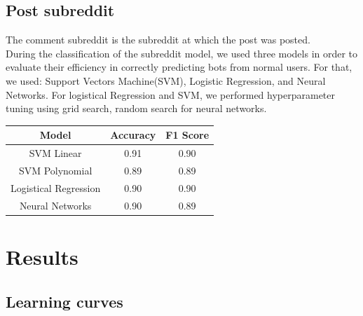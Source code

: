 \documentclass{article}
\begin{document}
    \subsection{Post subreddit}  
    
        The comment subreddit is the subreddit at which the post was posted. \\
    During the classification of  the subreddit model, we used three models in order to evaluate their efficiency in correctly predicting bots from normal users. For that, we used: Support Vectors Machine(SVM), Logistic Regression, and Neural Networks.
For logistical Regression and SVM, we performed hyperparameter tuning using grid search, random search for neural networks.

        \begin{center}
    \begin{tabular}{|c || c| c|} 
     \hline
     Model & Accuracy  & F1 Score  \\ [0.5ex] 
     \hline\hline
     SVM Linear & 0.91  & 0.90 \\ 
     \hline
     SVM Polynomial & 0.89 &0.89 \\
     \hline
     Logistical Regression & 0.90 & 0.90  \\ 
     \hline
     Neural Networks & 0.90  & 0.89\\
     \hline

    \end{tabular}
    \end{center}        
\section{Results}
    
    \subsection{Learning curves}
    
\end{document}

